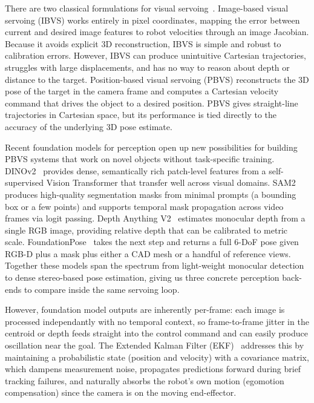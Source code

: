 \documentclass[letterpaper, 10 pt, conference]{ieeeconf}  %
\begin{document}
There are two classical formulations for visual servoing~\cite{chaumette2006}. Image-based visual servoing (IBVS) works entirely in pixel coordinates, mapping the error between current and desired image features to robot velocities through an image Jacobian. Because it avoids explicit 3D reconstruction, IBVS is simple and robust to calibration errors. However, IBVS can produce unintuitive Cartesian trajectories, struggles with large displacements, and has no way to reason about depth or distance to the target. Position-based visual servoing (PBVS) reconstructs the 3D pose of the target in the camera frame and computes a Cartesian velocity command that drives the object to a desired position. PBVS gives straight-line trajectories in Cartesian space, but its performance is tied directly to the accuracy of the underlying 3D pose estimate.

Recent foundation models for perception open up new possibilities for building PBVS systems that work on novel objects without task-specific training. DINOv2~\cite{dinov2} provides dense, semantically rich patch-level features from a self-supervised Vision Transformer that transfer well across visual domains. SAM2~\cite{sam2} produces high-quality segmentation masks from minimal prompts (a bounding box or a few points) and supports temporal mask propagation across video frames via logit passing. Depth Anything V2~\cite{depthanything} estimates monocular depth from a single RGB image, providing relative depth that can be calibrated to metric scale. FoundationPose~\cite{foundationpose} takes the next step and returns a full 6-DoF pose given RGB-D plus a mask plus either a CAD mesh or a handful of reference views. Together these models span the spectrum from light-weight monocular detection to dense stereo-based pose estimation, giving us three concrete perception back-ends to compare inside the same servoing loop.

However, foundation model outputs are inherently per-frame: each image is processed independantly with no temporal context, so frame-to-frame jitter in the centroid or depth feeds straight into the control command and can easily produce oscillation near the goal. The Extended Kalman Filter (EKF)~\cite{thrun2005} addresses this by maintaining a probabilistic state (position and velocity) with a covariance matrix, which dampens measurement noise, propagates predictions forward during brief tracking failures, and naturally absorbs the robot's own motion (egomotion compensation) since the camera is on the moving end-effector.
\end{document}
